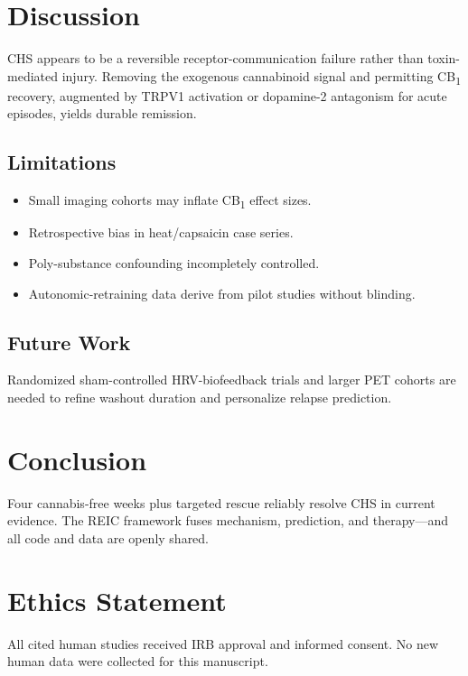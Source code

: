 \documentclass[11pt]{article}
\begin{document}
\section{Discussion}
CHS appears to be a reversible receptor-communication failure rather than toxin-mediated injury.
Removing the exogenous cannabinoid signal and permitting CB\textsubscript{1} recovery, augmented by TRPV1 activation or dopamine-2 antagonism for acute episodes, yields durable remission.

\subsection{Limitations}
\begin{itemize}
  \item Small imaging cohorts may inflate CB\textsubscript{1} effect sizes.
  \item Retrospective bias in heat/capsaicin case series.
  \item Poly-substance confounding incompletely controlled.
  \item Autonomic-retraining data derive from pilot studies without blinding.
\end{itemize}

\subsection{Future Work}
Randomized sham-controlled HRV-biofeedback trials and larger PET cohorts are needed to refine washout duration and personalize relapse prediction.

\section{Conclusion}
Four cannabis-free weeks plus targeted rescue reliably resolve CHS in current evidence.
The REIC framework fuses mechanism, prediction, and therapy—and all code and data are openly shared.

\section*{Ethics Statement}
All cited human studies received IRB approval and informed consent. No new human data were collected for this manuscript.
\end{document}
